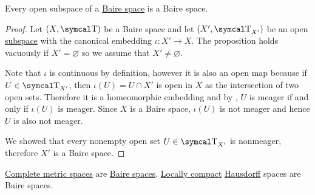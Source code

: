 \begin{proposition}\label{thm:open_subspace_of_baire_space_is_baire}
  Every open subspace of a \hyperref[def:baire_space]{Baire space} is a Baire space.
\end{proposition}
\begin{proof}
  Let \( (X, \CT) \) be a Baire space and let \( (X', \CT_{X'}) \) be an open \hyperref[def:topological_subspace]{subspace} with the canonical embedding \( \iota: X' \to X \). The proposition holds vacuously if \( X' = \varnothing \) so we assume that \( X' \neq \varnothing \).

  Note that \( \iota \) is continuous by definition, however it is also an open map because if \( U \in \CT_{X'} \), then \( \iota(U) = U \cap X' \) is open in \( X \) as the intersection of two open sets. Therefore it is a homeomorphic embedding and by , \( U \) is meager if and only if \( \iota(U) \) is meager. Since \( X \) is a Baire space, \( \iota(U) \) is not meager and hence \( U \) is also not meager.

  We showed that every nonempty open set \( U \in \CT_{X'} \) is nonmeager, therefore \( X' \) is a Baire space.
\end{proof}

\begin{theorem}\label{thm:baire_category_theorem}
  \begin{ThmEnum}
     \hyperref[def:complete_metric_space]{Complete metric spaces} are \hyperref[def:baire_space]{Baire spaces}.
     \hyperref[def:locally_compact_space]{Locally compact} \hyperref[def:separation_axioms/T2]{Hausdorff} spaces are Baire spaces.
  \end{ThmEnum}
\end{theorem}
